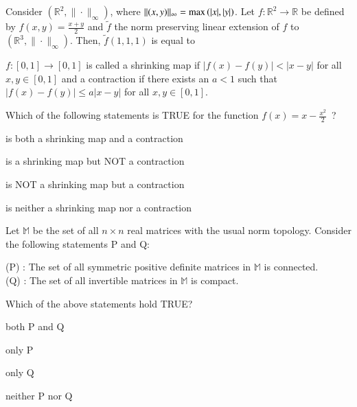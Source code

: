 \documentclass[journal]{IEEEtran}
\numberwithin{equation}{enumi}
\numberwithin{figure}{enumi}
\begin{document}
\begin{enumerate}
{\hfill{}

\item Consider $(\mathbb{R}^2, \|\cdot\|_{\infty})$, where $\|(x, y)\|_{\infty} = \max\left( |x|, |y| \right)$. Let $f : \mathbb{R}^2 \to \mathbb{R}$ be defined by $f(x, y) = \frac{x + y}{2}$ and $\tilde{f}$ the norm preserving linear extension of $f$ to $(\mathbb{R}^3, \|\cdot\|_{\infty})$. Then, $\tilde{f}(1, 1, 1)$ is equal to \underline

\hfill{}

\item $f : [0, 1] \to [0, 1]$ is called a shrinking map if $|f(x) - f(y)| < |x - y|$ for all $x, y \in [0, 1]$ and a contraction if there exists an $a < 1$ such that $|f(x) - f(y)| \leq a|x - y|$ for all $x, y \in [0, 1]$.

Which of the following statements is TRUE for the function $f(x) = x - \frac{x^2}{2}$\ ?

\begin{enumerate}
\begin{multicols}{2}
\item is both a shrinking map and a contraction
\item is a shrinking map but NOT a contraction
\item is NOT a shrinking map but a contraction
\item is neither a shrinking map nor a contraction
\end{multicols}
\end{enumerate}

\hfill{}

\item Let $\mathbb{M}$ be the set of all $n \times n$ real matrices with the usual norm topology. Consider the following statements P and Q:

(P) : The set of all symmetric positive definite matrices in $\mathbb{M}$ is connected.\\
(Q) : The set of all invertible matrices in $\mathbb{M}$ is compact.

Which of the above statements hold TRUE?

\begin{enumerate}
\begin{multicols}{2}
\item both P and Q
\item only P
\item only Q
\item neither P nor Q
\end{multicols}
\end{enumerate}

}
\end{enumerate}
\end{document}
